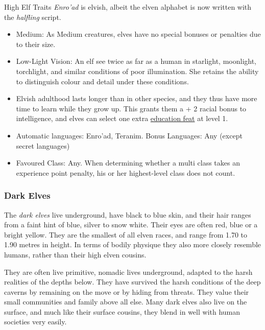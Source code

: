 \begin{35e}{High Elf Traits}
  \emph{Enro'ad} is elvish, albeit the elven alphabet is now written with
  the \emph{halfling} script.

  \begin{itemize}[noitemsep]
    \item Medium: As Medium creatures, elves have no special bonuses or
    penalties due to their size.
    \item Low-Light Vision: An elf see twice as far as a human in starlight,
    moonlight, torchlight, and similar conditions of poor illumination. She
    retains the ability to distinguish colour and detail under these
    conditions.
    \item Elvish adulthood lasts longer than in other species, and they thus
      have more time to learn while they grow up. This grants them a + 2
      racial bonus to intelligence, and elves can select one extra
      \hyperref[sec:Education Feats]{education feat} at level 1.
    \item Automatic languages: Enro'ad, Teranim. Bonus Languages: Any (except
      secret languages)
    \item Favoured Class: Any. When determining whether a multi class takes an
    experience point penalty, his or her highest-level class does not count.
  \end{itemize}
\end{35e}

\subsubsection*{Dark Elves}
\label{sec:Dark Elves}

The \emph{dark elves} live underground, have black to blue skin, and their
hair ranges from a faint hint of blue, silver to snow white. Their eyes are
often red, blue or a bright yellow. They are the smallest of all elven races,
and range from 1.70 to 1.90 metres in height. In terms of bodily physique
they also more closely resemble humans, rather than their high elven cousins.

They are often live primitive, nomadic lives underground, adapted to the harsh
realities of the depths below. They have survived the harsh conditions of the
deep caverns by remaining on the move or by hiding from threats. They value
their small communities and family above all else. Many dark elves also live
on the surface, and much like their surface cousins, they blend in well with
human societies very easily.

